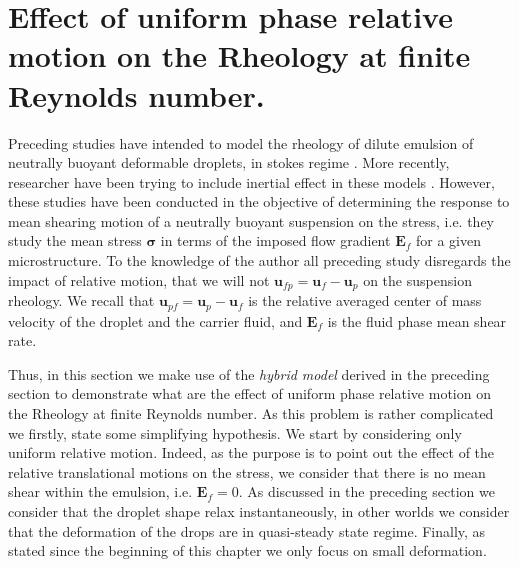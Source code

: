 \section{
    Effect of uniform phase relative motion on the Rheology at finite Reynolds number. 
    }
\label{sec:particle_def}














Preceding studies have intended to model the rheology of dilute emulsion of neutrally buoyant deformable droplets, in stokes regime \citep{goddard1967nonlinear,lhuillier1987phenomenology,maffettone1998equation}.
More recently, researcher have been trying to include inertial effect in these models \citet{raja2010inertial,mwasame2018macroscopic}. 
However, these studies have been conducted in the objective of determining the response to mean shearing motion of a neutrally buoyant suspension on the stress, i.e. they study the mean stress $\bm{\sigma}$ in terms of the imposed flow gradient $\textbf{E}_f$ for a given microstructure. 
To the knowledge of the author all preceding study disregards the impact of relative motion, that we will not $\textbf{u}_{fp} = \textbf{u}_f - \textbf{u}_p$ on the suspension rheology.
We recall that $\textbf{u}_{p f} = \textbf{u}_p  - \textbf{u}_f$ is the relative averaged center of mass velocity of the droplet and the carrier fluid,  and $\textbf{E}_f$ is the fluid phase mean shear rate. 


Thus, in this section we make use of the \textit{hybrid model} derived in the preceding section to demonstrate what are the effect of uniform phase relative motion on the Rheology at finite Reynolds number. 
As this problem is rather complicated we firstly, state some simplifying hypothesis. 
We start by considering only uniform relative motion. 
Indeed, as the purpose is to point out the effect of the relative translational motions on the stress, we consider that there is no mean shear within the emulsion, i.e. $\textbf{E}_f = 0$. 
As discussed in the preceding section we consider that the droplet shape relax instantaneously, in other worlds we consider that the deformation of the drops are in quasi-steady state regime. 
Finally, as stated since the beginning of this chapter we only focus on small deformation.  



